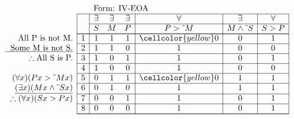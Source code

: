 \documentclass[10pt,legalpaper,landscape,cmtt]{article}
\begin{document}
{\begin{minipage}[t]{3.25in}
	\(
	\begin{array}{r|c|ccc|c|c|c|}
		\multicolumn{2}{c}{}&\multicolumn{6}{l}{\mbox{Form: IV-EOA}} \\ \cline{2-8}
		\hspace{1in}	&	& \exists & \exists & \exists & \forall & \exists & \forall\\ \cline{3-8}
		&	& S & M & P &  P > \tilde~M  &  M \wedge \tilde~S  &  S > P \\ \cline{2-8} \cline{2-8}
		\phantom{\therefore}\mbox{All P is not M.}   & 1 & 1 & 1 & 1 &   \cellcolor{yellow} 0   &   0   &   1  \\ \cline{2-8}
		\underline{\phantom{\therefore}\mbox{Some M is not S.}}   & 2 & 1 & 1 & 0 &   1   &   0   &   0  \\ \cline{2-8}
		\therefore \mbox{All S is P.}   & 3 & 1 & 0 & 1 &   1   &   0   &   1  \\ \cline{2-8}
		& 4 & 1 & 0 & 0 &   1   &   0   &   0  \\ \cline{2-8}
		(\forall x)(Px > \tilde~Mx)   & 5 & 0 & 1 & 1 &   \cellcolor{yellow} 0   &   1   &   1  \\ \cline{2-8}
		\underline{(\exists x)(Mx \wedge \tilde~Sx)}   & 6 & 0 & 1 & 0 &   1   &   1   &   1  \\ \cline{2-8}
		\therefore(\forall x)(Sx > Px)   & 7 & 0 & 0 & 1 &   1   &   0   &   1  \\ \cline{2-8}
		& 8 & 0 & 0 & 0 &   1   &   0   &   1   \\ \cline{2-8}\cline{2-8} 
	\end{array}
	\)
\end{minipage}

}
\end{document}
